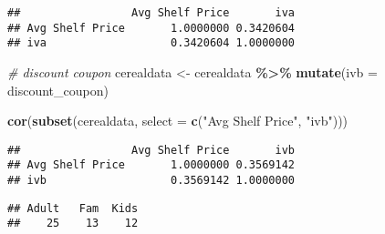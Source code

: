 \documentclass[
]{article}
\newenvironment{Shaded}{\begin{snugshade}}{\end{snugshade}}
\newcommand{\AttributeTok}[1]{\textcolor[rgb]{0.13,0.29,0.53}{#1}}
\newcommand{\CommentTok}[1]{\textcolor[rgb]{0.56,0.35,0.01}{\textit{#1}}}
\newcommand{\FunctionTok}[1]{\textcolor[rgb]{0.13,0.29,0.53}{\textbf{#1}}}
\newcommand{\NormalTok}[1]{#1}
\newcommand{\OtherTok}[1]{\textcolor[rgb]{0.56,0.35,0.01}{#1}}
\newcommand{\SpecialCharTok}[1]{\textcolor[rgb]{0.81,0.36,0.00}{\textbf{#1}}}
\newcommand{\StringTok}[1]{\textcolor[rgb]{0.31,0.60,0.02}{#1}}
\begin{document}
\begin{verbatim}
##                 Avg Shelf Price       iva
## Avg Shelf Price       1.0000000 0.3420604
## iva                   0.3420604 1.0000000
\end{verbatim}

\begin{Shaded}
\begin{Highlighting}[]
\CommentTok{\# discount coupon}
\NormalTok{cerealdata }\OtherTok{\textless{}{-}}\NormalTok{ cerealdata }\SpecialCharTok{\%\textgreater{}\%}
  \FunctionTok{mutate}\NormalTok{(}\AttributeTok{ivb =}\NormalTok{ discount\_coupon)}

\FunctionTok{cor}\NormalTok{(}\FunctionTok{subset}\NormalTok{(cerealdata, }\AttributeTok{select =} \FunctionTok{c}\NormalTok{(}\StringTok{"Avg Shelf Price"}\NormalTok{, }\StringTok{"ivb"}\NormalTok{)))}
\end{Highlighting}
\end{Shaded}

\begin{verbatim}
##                 Avg Shelf Price       ivb
## Avg Shelf Price       1.0000000 0.3569142
## ivb                   0.3569142 1.0000000
\end{verbatim}

\begin{Shaded}
\end{Shaded}

\begin{verbatim}
## Adult   Fam  Kids 
##    25    13    12
\end{verbatim}
\end{document}
